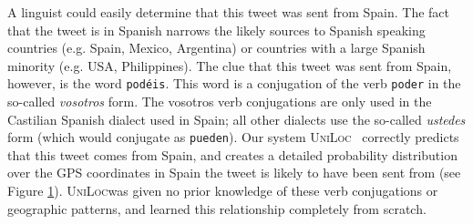\documentclass[sigconf,10pt]{acmart}
\newcommand{\str}[1]{\texttt{#1}}
\newcommand{\defn}[1]{\textit{#1}}
\newcommand{\uniloc}{\textsc{UniLoc}}
\begin{document}
\noindent
A linguist could easily determine that this tweet was sent from Spain.
The fact that the tweet is in Spanish narrows the likely sources to 
Spanish speaking countries (e.g. Spain, Mexico, Argentina) 
or countries with a large Spanish minority (e.g. USA, Philippines).
The clue that this tweet was sent from Spain, however, is the word \str{pod\'eis}.
This word is a conjugation of the verb \str{poder} in the so-called \defn{vosotros} form.
The vosotros verb conjugations are only used in the Castilian Spanish dialect used in Spain;
all other dialects use the so-called \defn{ustedes} form (which would conjugate as \str{pueden}).
Our system \uniloc~ correctly predicts that this tweet comes from Spain,
and creates a detailed probability distribution over the GPS coordinates in Spain the tweet is likely to have been sent from (see Figure \ref{fig:poder}).
\uniloc was given no prior knowledge of these verb conjugations or geographic patterns,
and learned this relationship completely from scratch.

\begin{figure}
    \caption{}
    \label{fig:poder}
\end{figure}

\end{document}
